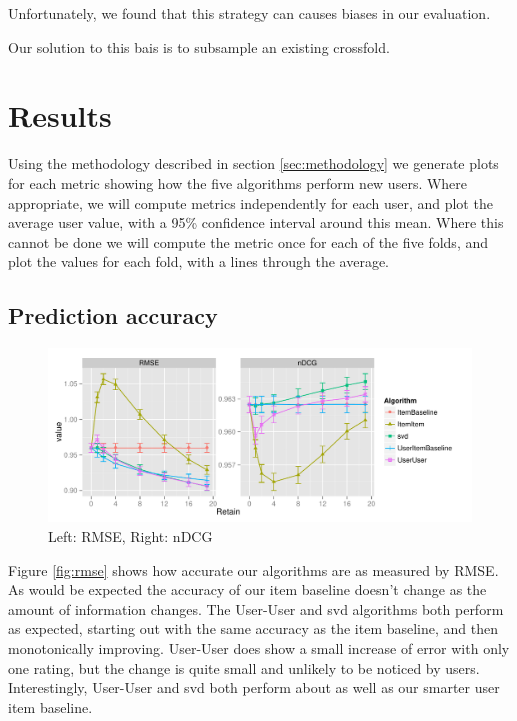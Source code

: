 \documentclass[letterpaper]{sig-alternate}
\begin{document}
  Unfortunately, we found that this strategy can causes biases in our evaluation.
  
  Our solution to this bais is to subsample an existing crossfold.

\section{Results}

  Using the methodology described in section \ref{sec:methodology} we generate plots for each metric showing how the five algorithms perform new users.
  Where appropriate, we will compute metrics independently for each user, and plot the average user value, with a 95\% confidence interval around this mean.
  Where this cannot be done we will compute the metric once for each of the five folds, and plot the values for each fold, with a lines through the average.

\subsection{Prediction accuracy}
\begin{figure}
  \centering

  \includegraphics[width=\linewidth]{../lenskit/output/ekstrandTuned20/accuracy.pdf}
  \caption{Left: RMSE, Right: nDCG}
  \label{fig:rmse}
  \label{fig:ndcg}
\end{figure}
  Figure \ref{fig:rmse} shows how accurate our algorithms are as measured by RMSE.
  As would be expected the accuracy of our item baseline doesn't change as the amount of information changes.
  The User-User and svd algorithms both perform as expected, starting out with the same accuracy as the item baseline, and then monotonically improving.
  User-User does show a small increase of error with only one rating, but the change is quite small and unlikely to be noticed by users.
  Interestingly, User-User and svd both perform about as well as our smarter user item baseline. %
\end{document}
